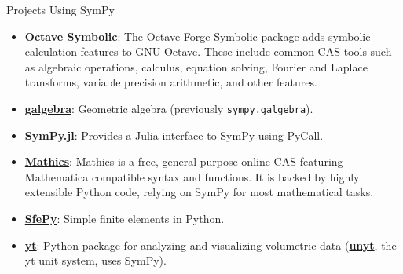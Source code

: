 \documentclass[xcolor=svgnames]{beamer}
\begin{document}
\begin{frame}{Projects Using SymPy}
\begin{itemize}
\item
  \href{http://octave.sourceforge.net/symbolic/}{\textbf{Octave Symbolic}}:
  The Octave-Forge Symbolic package adds symbolic calculation features
  to GNU Octave. These include common CAS tools such
  as algebraic operations, calculus, equation solving, Fourier and
  Laplace transforms, variable precision arithmetic, and other features.
\item
  \href{https://github.com/pygae/galgebra}{\textbf{galgebra}}:
  Geometric algebra (previously \texttt{sympy.galgebra}).
\item
  \href{https://github.com/jverzani/SymPy.jl}{\textbf{SymPy.jl}}:
  Provides a Julia interface to SymPy using PyCall.
\item
  \href{https://mathics.github.io/}{\textbf{Mathics}}: Mathics is a
  free, general-purpose online CAS featuring Mathematica compatible
  syntax and functions. It is backed by highly extensible Python code,
  relying on SymPy for most mathematical tasks.
\item
  \href{http://sfepy.org/}{\textbf{SfePy}}: Simple finite elements in
  Python.
\item
  \href{https://yt-project.org/}{\textbf{yt}}: Python package for
  analyzing and visualizing volumetric data
  (\href{https://unyt.readthedocs.io/en/stable/}{\textbf{unyt}}, the yt unit
  system, uses SymPy).
\end{itemize}
\end{frame}
\end{document}
